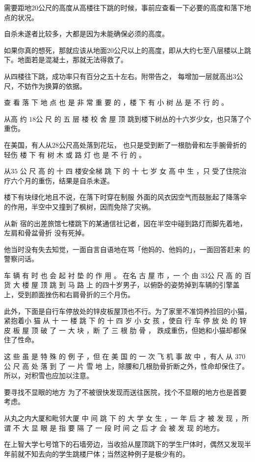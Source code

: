 \documentclass[UTF8]{ctexart}
\begin{document}
需要距地$20$公尺的高度从高楼往下跳的时候，事前应查看一下必要的高度和落下地点的状况。

自杀未遂者比较多，大都是因为未能确保必须的高度。

如果你真的想死，那就应该从地面$20$公尺以上的高度，即从大约七至八层楼以上跳下。地面若是混凝土，那就无法得救了。

从四楼往下跳，成功率只有百分之五十左右。附带告之， 每增加一层就高出$3$公尺，不妨作为换算的依据。

查 看 落 下 地 点 也 是 非 常 重 要 的 ，楼 下 有 小 树 丛 是 不 行 的 。

从高 约 $18$公 尺 的 五 层 楼 校 舍 屋 顶 跳到楼下树丛的十六岁少女，也只落了个重伤。

在美国，有人从$28$公尺高处落到花坛， 也只是受到断了一根肋骨和左手腕骨折的轻伤 楼 下 有 树 木 或 路 灯 也 是 不 行 的 。

从$35$ 公 尺 高 的 十 四 楼安全梯 跳 下 的 十 七 岁 女 高 中 生 ，只 受了住院治疗六个月的重伤，结果是自杀未遂。

楼下有块绿化地且不说，在落下时穿在制服 外面的风衣因空气而鼓胀起了降落伞的作用，半空中又撞到了枫树，因而免除了灾祸。

从新 宿的出差旅馆七楼跳下的某通信社记者，因在半空中碰到路灯而脚先着地，左肩和骨盆骨折 没有死掉。

他当时没有失去知觉，一面自言自语地在骂「他妈的、他妈的」，一面回答赶来 的警察问话。

车 辆 有 时 也 会 起 衬 垫 的 作 用 。
在名 古 屋 市 ，一 个 由 $33$公 尺 高 的 百 货 大 楼 屋 顶 跳 到 马 路 上 的四十岁男子，以俯卧的姿势掉到车辆的引擎盖上，受到颜面挫伤和右肩骨折的三个月伤。

此外，下面是自行车停放处的锌皮板屋顶也不行。为了家里不准饲养捡回的小猫，紧抱着小 猫 从 十 一 楼 跳 下 的 十 四 岁 小 女 孩 ，使自 行 车 停 放 处 的 锌 皮 板 屋 顶 破 了 一 大 块 ，断 了 三 根 肋 骨 ， 跌成重伤，但她和小猫却都保住了性命。

这 些 虽 是 特 殊 的 例 子 ，但 在 美 国 的 一 次 飞 机 事 故 中 ，有人 从 $370$公 尺 高 处 落 到 了 一 片 雪 地 上，除腰和几根肋骨折断之外，性命却保住了。所以，对积雪也应加以注意。

要寻找不显眼的地方 为了不被很快发现而送往医院，找个不显眼的地方也是首要考虑。

从丸之内大厦和毗邻大厦 中 间 跳 下 的 大 学 女 生 ，一 年 后 才 被 发 现 ，所谓 不 大 显 眼 是 指 要 隔 了 一 段 时 间 之 后 才 会 被 发 现 的地方。

在上智大学七号馆下的石墙旁边，当收拾从屋顶跳下的学生尸体时，偶然又发现半 年前就不知去向的学生跳楼尸体；当然这种例子是极少有的。
\end{document}
